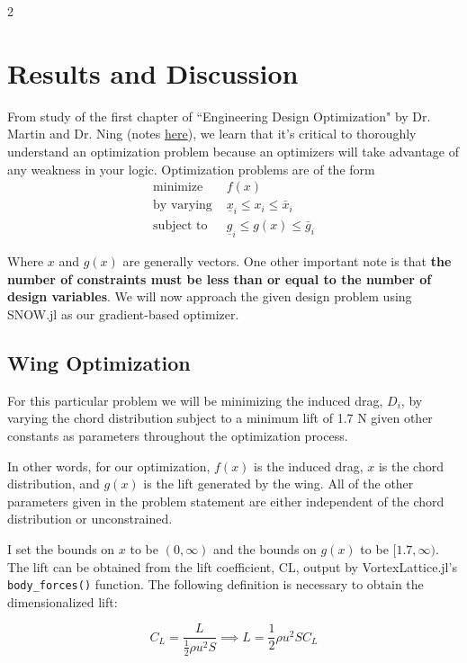 \documentclass[11pt]{article}
\begin{document}
\begin{multicols}{2}
\section{Results and Discussion}
From study of the first chapter of ``Engineering Design Optimization" by Dr. Martin and 
Dr. Ning (notes \href{https://github.com/samiamandyesican/497R/wiki/Design-Optimization}{here}), 
we learn that it's critical to thoroughly understand
an optimization problem because an optimizers will take advantage of any weakness
in your logic. Optimization problems are of the form \vspace{0pt}
\begin{align*}
    \text{minimize }& f(x) \\
    \text{by varying }& \underline x_i \leq x_i \leq \bar x_i \\
    \text{subject to }& \underline g_i \leq g(x) \leq \bar g_i
\end{align*}

Where $x$ and $g(x)$ are generally vectors.
One other important note is that \textbf{the number of constraints must be 
less than or equal to the number of design variables}. We will now 
approach the given design problem using SNOW.jl as our gradient-based
optimizer.\par

\subsection{Wing Optimization}
For this particular problem we will be minimizing the induced drag, $D_i$,
by varying the chord distribution subject to a minimum lift of 1.7 N given other constants as parameters throughout the optimization process.\par

In other words, for our optimization, $f(x)$ is the induced drag, $x$ is the chord distribution, and $g(x)$ is the lift generated by the wing. All of the other parameters given in the problem statement are either independent of the chord distribution or unconstrained. \par

I set the bounds on $x$ to be $(0, \infty)$ and the bounds on $g(x)$ to be $[1.7, \infty)$. The lift can be obtained from the lift coefficient, CL, output by VortexLattice.jl's \texttt{body\_forces()} function. The following definition is necessary to obtain the dimensionalized lift:

\[
C_L = \frac{L}{\frac{1}{2}\rho u^2 S} \implies L = \frac{1}{2}\rho u^2 S C_L
\]


\end{multicols}
\end{document}
